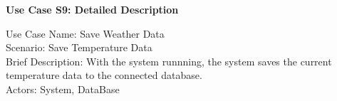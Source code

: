 \documentclass[letterpaper]{article}
\begin{document}
\noindent
\begin{center}
\textbf{Use Case S9:  Detailed Description}
\end{center}
Use Case Name:  Save Weather Data\\
Scenario:  Save Temperature Data\\
Brief Description:  With the system runnning, the system saves the
current temperature data to the connected database.\\
Actors:  System, DataBase\\\\
\end{document}
